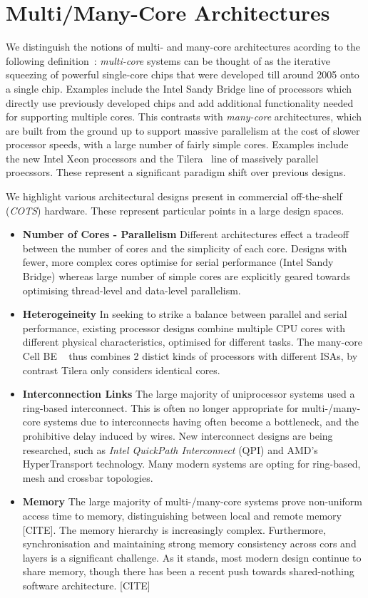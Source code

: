 \section{Multi/Many-Core Architectures}
\label{sec:overview}
We distinguish the notions of multi- and many-core
architectures acording to the following definition~\cite{Re:12}:
\emph{multi-core} systems can be thought of as the iterative squeezing of powerful
 single-core chips that
were developed till around 2005 onto a single chip. Examples include the
 Intel Sandy Bridge line of processors which directly use previously developed chips
and add additional functionality needed for supporting multiple cores. This
contrasts with \emph{many-core} architectures, which are built from the ground up 
to support massive parallelism at the cost of slower processor speeds,
with a large number of fairly simple cores.  Examples include
the new Intel Xeon processors and the Tilera~\cite{bell2008tile64} line of massively parallel proecssors.
These represent a significant paradigm shift over previous designs.

We highlight various architectural designs present in commercial off-the-shelf
(\emph{COTS}) hardware. These represent particular points in a large design
spaces.
\begin{itemize}
\item {\bf Number of Cores - Parallelism} Different architectures effect a tradeoff between the
number of cores and the simplicity of each core. Designs with fewer,
more complex cores optimise for serial performance (Intel Sandy Bridge)
whereas large number of simple cores are explicitly geared towards
optimising thread-level and data-level parallelism.
\item {\bf Heterogeineity} In seeking to strike a balance between parallel and
serial performance, existing processor designs combine multiple CPU cores with
different physical characteristics, optimised for different tasks. The many-core Cell BE ~\cite{Cell} thus combines 2 distict kinds of processors with different ISAs, by
contrast Tilera only considers identical cores.
\item {\bf Interconnection Links} The large majority of uniprocessor systems
used a ring-based interconnect. This is often no longer appropriate for
multi-/many-core systems due to interconnects having often become a bottleneck,
and the prohibitive delay induced by wires. New interconnect designs are being researched,
such as \emph{Intel QuickPath Interconnect} (QPI) and  AMD's HyperTransport technology.
Many modern systems are opting for ring-based, mesh and crossbar topologies.
\item {\bf Memory} The large majority of multi-/many-core systems prove
non-uniform access time to memory, distinguishing between local and remote
memory [CITE]. The memory hierarchy is increasingly complex.
Furthermore, synchronisation and maintaining strong memory consistency across
cors and layers is a significant challenge. As it stands, most modern
design continue to share memory, though there has been a recent push
towards shared-nothing software architecture. [CITE]
\end{itemize}
